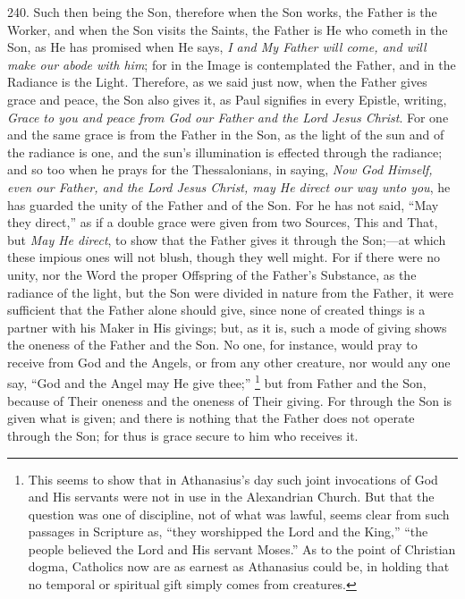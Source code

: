 240. Such
then being the Son, therefore when the Son works, the Father is the
Worker, and when the Son visits the Saints, the Father is He who
cometh in the Son, as He has promised when He says, \emph{I and My Father
will come, and will make our abode with him}; for in the Image is
contemplated the Father, and in the Radiance is the Light. Therefore,
as we said just now, when the Father gives grace and peace, the Son
also gives it, as Paul signifies in every Epistle, writing, \emph{Grace
to you and peace from God our Father and the Lord Jesus Christ}.
For one and the same grace is from the Father in the Son, as the light
of the sun and of the radiance is one, and the sun's illumination is
effected through the radiance; and so too when he prays for the
Thessalonians, in saying, \emph{Now God Himself, even our Father, and the
Lord Jesus Christ, may He direct our way unto you}, he has guarded
the unity of the Father and of the Son. For he has not said, ``May they
direct,'' as if a double grace were given from two Sources, This and
That, but \emph{May He direct}, to show that the Father gives it
through the Son;—at which these impious ones will not blush, though
they well might. For if there were no unity, nor the Word the
proper Offspring of the Father's Substance, as the radiance of the
light, but the Son were divided in nature from the Father, it were
sufficient that the Father alone should give, since none of created
things is a partner with his Maker in His givings; but, as it is, such
a mode of giving shows the oneness of the Father and the Son. No one,
for instance, would pray to receive from God and the Angels, or from
any other creature, nor would any one say, ``God and the Angel may He
give thee;'' \footnote{This seems to show that in Athanasius's day such joint invocations of
God and His servants were not in use in the Alexandrian Church. But
that the question was one of discipline, not of what was lawful, seems
clear from such passages in Scripture as, ``they worshipped the Lord
and the King,'' ``the people believed the Lord and His servant Moses.''
As to the point of Christian dogma, Catholics now are as earnest as
Athanasius could be, in holding that no temporal or spiritual gift
simply comes from creatures.} but from
Father and the Son, because of Their oneness and the oneness of Their
giving. For through the Son is given what is given; and there is
nothing that the Father does not operate through the Son; for thus is
grace secure to him who receives it.

